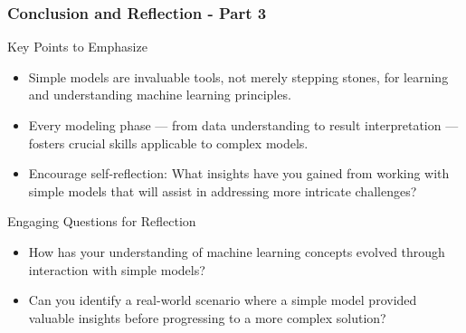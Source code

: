 \documentclass[aspectratio=169]{beamer}
\begin{document}
\begin{frame}[fragile]
    \frametitle{Conclusion and Reflection - Part 3}
    \begin{block}{Key Points to Emphasize}
        \begin{itemize}
            \item Simple models are invaluable tools, not merely stepping stones, for learning and understanding machine learning principles.
            \item Every modeling phase — from data understanding to result interpretation — fosters crucial skills applicable to complex models.
            \item Encourage self-reflection: What insights have you gained from working with simple models that will assist in addressing more intricate challenges?
        \end{itemize}
    \end{block}

    \begin{block}{Engaging Questions for Reflection}
        \begin{itemize}
            \item How has your understanding of machine learning concepts evolved through interaction with simple models?
            \item Can you identify a real-world scenario where a simple model provided valuable insights before progressing to a more complex solution?
        \end{itemize}
    \end{block}
\end{frame}
\end{document}
